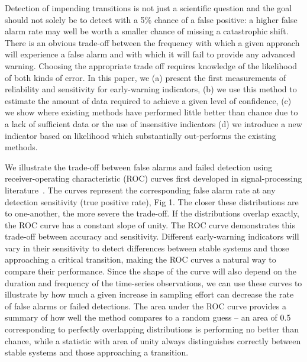 \documentclass{pnastwo}
\begin{document}
\begin{article}
Detection of impending transitions is not just a scientific question 
and the goal should not solely be to detect with a 5\% chance of a false positive:
a higher false alarm rate may well be  worth a smaller chance of  missing a catastrophic shift. 
There is an obvious trade-off between the frequency with which a given approach will experience a false alarm and
with which it will fail to provide any advanced warning. 
Choosing the appropriate trade off requires knowledge of the likelihood of both kinds of error.
In this paper, we
(a) present the first measurements of reliability and sensitivity for early-warning indicators, 
(b) we use this method to estimate the amount of data required to achieve a given level of confidence,  
(c) we show where existing methods have performed little better than chance due to a lack of sufficient data or the use of insensitive indicators 
(d) we introduce a new indicator based on likelihood which substantially out-performs the existing methods.     

We illustrate the trade-off between false alarms and failed detection using 
receiver-operating characteristic (ROC) curves first developed in signal-processing literature~\cite{Green1989, Keller2009}⁠. 
The curves represent the corresponding false alarm rate at any detection sensitivity (true positive rate), Fig 1.
The closer these distributions are to one-another, the more severe the trade-off.  
If the distributions overlap exactly, the ROC curve has a constant slope of unity.  
The ROC curve demonstrates this trade-off between accuracy and sensitivity.  
Different early-warning indicators will vary in their sensitivity to detect differences between stable systems and those approaching a critical transition, making the ROC curves a natural way to compare their performance.  
Since the shape of the curve will also depend on the duration and frequency of the time-series observations,
we can use these curves to illustrate by how much a given increase in sampling effort can decrease the rate of false alarms or failed detections.  
The area under the ROC curve provides a summary of how well the method compares to a random guess --
an area of 0.5 corresponding to perfectly overlapping distributions is performing no better than chance, while a statistic with area of unity always distinguishes correctly between stable systems and those approaching a transition. 


\end{article}
\end{document}
